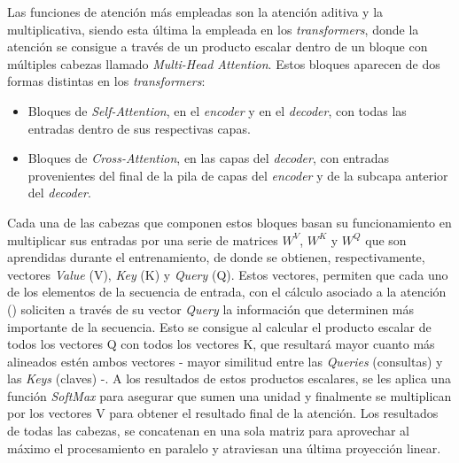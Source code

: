 Las funciones de atención más empleadas son la atención aditiva \cite{neuralmachinetranslationalignandtranslate} y la multiplicativa, siendo esta última la empleada en los \textit{transformers}, donde la atención se consigue a través de un producto escalar dentro de un bloque con múltiples cabezas llamado \textit{Multi-Head Attention}. Estos bloques aparecen de dos formas distintas en los \textit{transformers}:
\begin{itemize}
    \item Bloques de \textit{Self-Attention}, en el \textit{encoder} y en el \textit{decoder}, con todas las entradas dentro de sus respectivas capas.
    \item Bloques de \textit{Cross-Attention}, en las capas del \textit{decoder}, con entradas provenientes del final de la pila de capas del \textit{encoder} y de la subcapa anterior del \textit{decoder}.
\end{itemize}
Cada una de las cabezas que componen estos bloques basan su funcionamiento en multiplicar sus entradas por una serie de matrices $W^V$, $W^K$ y $W^Q$ que son aprendidas durante el entrenamiento, de donde se obtienen, respectivamente, vectores \textit{Value} (V), \textit{Key} (K) y \textit{Query} (Q). Estos vectores, permiten que cada uno de los elementos de la secuencia de entrada, con el cálculo asociado a la atención () soliciten a través de su vector \textit{Query} la información que determinen más importante de la secuencia. Esto se consigue al calcular el producto escalar de todos los vectores Q con todos los vectores K, que resultará mayor cuanto más alineados estén ambos vectores - mayor similitud entre las \textit{Queries} (consultas) y las \textit{Keys} (claves) -. A los resultados de estos productos escalares, se les aplica una función \textit{SoftMax} para asegurar que sumen una unidad y finalmente se multiplican por los vectores V para obtener el resultado final de la atención. Los resultados de todas las cabezas, se concatenan en una sola matriz para aprovechar al máximo el procesamiento en paralelo y atraviesan una última proyección linear.

